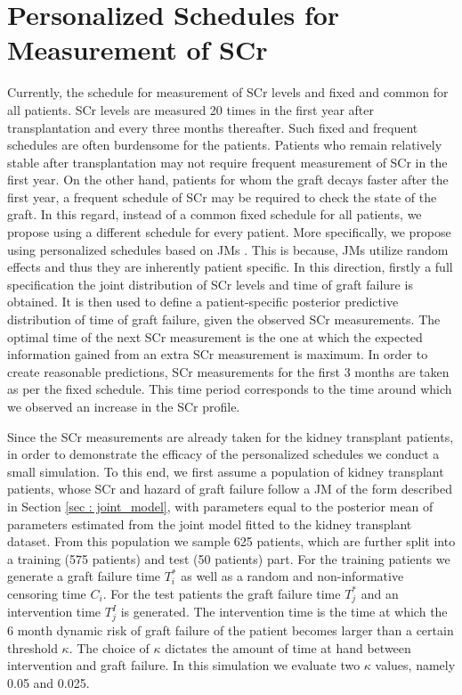 
\section{Personalized Schedules for Measurement of SCr}
\label{sec: simulation_study}
Currently, the schedule for measurement of SCr levels and fixed and common for all patients. SCr levels are measured 20 times in the first year after transplantation and every three months thereafter. Such fixed and frequent schedules are often burdensome for the patients. Patients who remain relatively stable after transplantation may not require frequent measurement of SCr in the first year. On the other hand, patients for whom the graft decays faster after the first year, a frequent schedule of SCr may be required to check the state of the graft. In this regard, instead of a common fixed schedule for all patients, we propose using a different schedule for every patient. More specifically, we propose using personalized schedules based on JMs \citet{drizopoulosPersScreening}. This is because, JMs utilize random effects and thus they are inherently patient specific. In this direction, firstly a full specification the joint distribution of SCr levels and time of graft failure is obtained. It is then used to define a patient-specific posterior predictive distribution of time of graft failure, given the observed SCr measurements. The optimal time of the next SCr measurement is the one at which the expected information gained from an extra SCr measurement is maximum. In order to create reasonable predictions, SCr measurements for the first 3 months are taken as per the fixed schedule. This time period corresponds to the time around which we observed an increase in the SCr profile.

Since the SCr measurements are already taken for the kidney transplant patients, in order to demonstrate the efficacy of the personalized schedules we conduct a small simulation. To this end, we first assume a population of kidney transplant patients, whose SCr and hazard of graft failure follow a JM of the form described in Section \ref{sec : joint_model}, with parameters equal to the posterior mean of parameters estimated from the joint model fitted to the kidney transplant dataset. From this population we sample 625 patients, which are further split into a training (575 patients) and test (50 patients) part. For the training patients we generate a graft failure time $T^*_i$ as well as a random and non-informative censoring time $C_i$. For the test patients the graft failure time $T^*_j$ and an intervention time $T^I_j$ is generated. The intervention time is the time at which the 6 month dynamic risk of graft failure of the patient becomes larger than a certain threshold $\kappa$. The choice of $\kappa$ dictates the amount of time at hand between intervention and graft failure. In this simulation we evaluate two $\kappa$ values, namely 0.05 and 0.025. 

